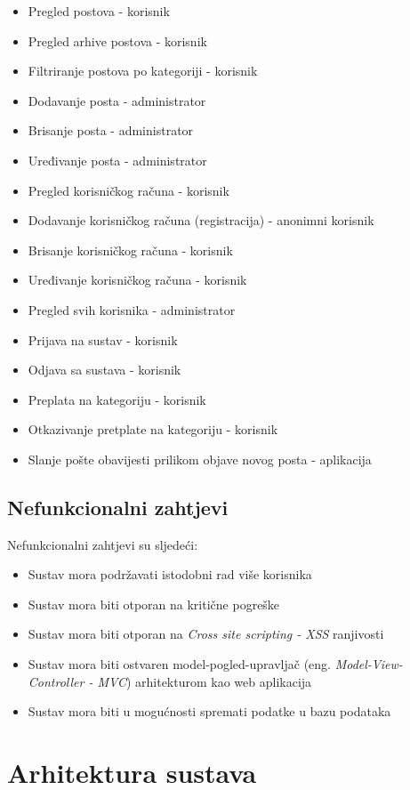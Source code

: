 \documentclass[zavrsni, numeric]{fer}
\begin{document}
 
\begin{itemize}
	\item Pregled postova - korisnik
	\item Pregled arhive postova - korisnik
	\item Filtriranje postova po kategoriji - korisnik
	\item Dodavanje posta - administrator
	\item Brisanje posta - administrator
	\item Uređivanje posta - administrator
	\item Pregled korisničkog računa - korisnik
	\item Dodavanje korisničkog računa (registracija) - anonimni korisnik
	\item Brisanje korisničkog računa - korisnik 
	\item Uređivanje korisničkog računa - korisnik
	\item Pregled svih korisnika - administrator
	\item Prijava na sustav - korisnik 
	\item Odjava sa sustava - korisnik
	\item Preplata na kategoriju - korisnik
	\item Otkazivanje pretplate na kategoriju - korisnik
	\item Slanje pošte obavijesti prilikom objave novog posta - aplikacija
\end{itemize}

\section{Nefunkcionalni zahtjevi}
Nefunkcionalni zahtjevi su sljedeći:

\begin{itemize}
	\item Sustav mora podržavati istodobni rad više korisnika
	\item Sustav mora biti otporan na kritične pogreške
	\item Sustav mora biti otporan na \textit{Cross site scripting - XSS}\citep{xss} ranjivosti
	\item Sustav mora biti ostvaren model-pogled-upravljač (eng. \textit{Model-View-Controller - MVC}) arhitekturom kao web aplikacija
	\item Sustav mora biti u mogućnosti spremati podatke u bazu podataka
\end{itemize}

\chapter{Arhitektura sustava}
\end{document}

